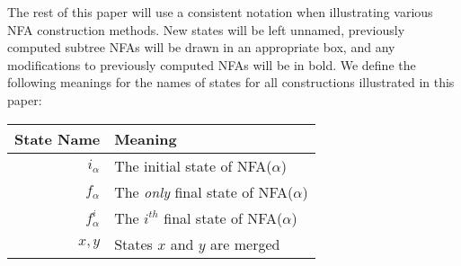 The rest of this paper will use a consistent notation when illustrating various NFA construction methods. New states will be left unnamed, previously computed subtree NFAs will be drawn in an appropriate box, and any modifications to previously computed NFAs will be in bold. We define the following meanings for the names of states for all constructions illustrated in this paper:
\begin{center}
  \begin{tabular}{r|l}
    State Name & Meaning \\
    \hline
    $i_\alpha$  & The initial state of NFA($\alpha$) \\
    $f_\alpha$  & The \emph{only} final state of NFA($\alpha$) \\
    $f^i_\alpha$ & The $i^{th}$ final state of NFA($\alpha$) \\
    $x, y$      & States $x$ and $y$ are merged
  \end{tabular}
\end{center}

